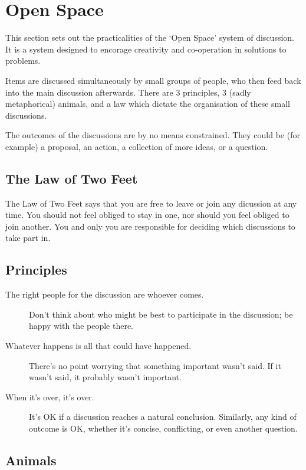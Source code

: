 \documentclass[a4paper, 12pt]{article} %
\begin{document}
\appendix

\section{Open Space}
\label{sec:openspace}
This section sets out the practicalities of the `Open Space' system of discussion.  It is a system designed to encorage creativity and co-operation in solutions to problems.

Items are discussed simultaneously by small groups of people, who then feed back into the main discussion afterwards.  There are 3 principles, 3 (sadly metaphorical) animals, and a law which dictate the organisation of these small discussions.

The outcomes of the discussions are by no means constrained.  They could be (for example) a proposal, an action, a collection of more ideas, or a question.

\subsection{The Law of Two Feet}
The Law of Two Feet says that you are free to leave or join any dicussion at any time.  You should not feel obliged to stay in one, nor should you feel obliged to join another.  You and only you are responsible for deciding which discussions to take part in.

\subsection{Principles}
\begin{description}
\item[The right people for the discussion are whoever comes.]  Don't think about who might be best to participate in the discussion; be happy with the people there.
\item[Whatever happens is all that could have happened.]  There's no point worrying that something important wasn't said.  If it wasn't said, it probably wasn't important.
\item[When it's over, it's over.]  It's OK if a discussion reaches a natural conclusion.  Similarly, any kind of outcome is OK, whether it's concise, conflicting, or even another question.
\end{description}

\subsection{Animals}
\end{document}
